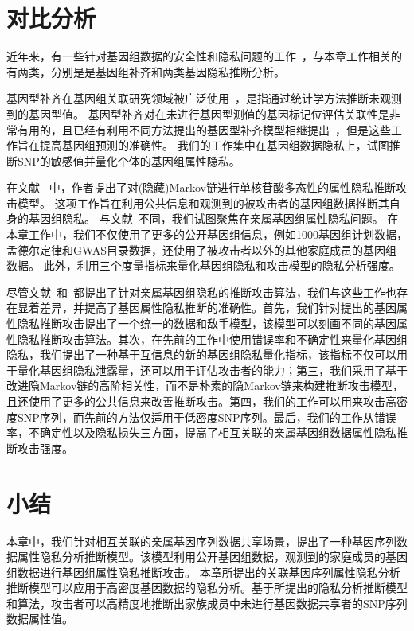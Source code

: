 \section{对比分析}

近年来，有一些针对基因组数据的安全性和隐私问题的工作~\cite{hubaux2017genomic}，与本章工作相关的有两类，分别是是基因组补齐和两类基因隐私推断分析。

基因型补齐在基因组关联研究领域被广泛使用~\cite{marchini2007newa}，是指通过统计学方法推断未观测到的基因型值。 基因型补齐对在未进行基因型测值的基因标记位评估关联性是非常有用的，且已经有利用不同方法提出的基因型补齐模型相继提出~\cite{howie2009flexible,marchini2007newa,howie2014impute2}，但是这些工作旨在提高基因组预测的准确性。 我们的工作集中在基因组数据隐私上，试图推断SNP的敏感值并量化个体的基因组属性隐私。


在文献~\cite{samani2015quantifying} 中，作者提出了对(隐藏)Markov链进行单核苷酸多态性的属性隐私推断攻击模型。 这项工作旨在利用公共信息和观测到的被攻击者的基因组数据推断其自身的基因组隐私。 与文献~\cite{samani2015quantifying}不同，我们试图聚焦在亲属基因组属性隐私问题。 在本章工作中，我们不仅使用了更多的公开基因组信息，例如1000基因组计划数据，孟德尔定律和GWAS目录数据，还使用了被攻击者以外的其他家庭成员的基因组数据。 此外，利用三个度量指标来量化基因组隐私和攻击模型的隐私分析强度。

尽管文献~\cite{humbert2013addressing,humbert2017quantifying}和~\cite{deznabi2018inference}都提出了针对亲属基因组隐私的推断攻击算法，我们与这些工作也存在显着差异，并提高了基因属性隐私推断的准确性。首先，我们针对提出的基因属性隐私推断攻击提出了一个统一的数据和敌手模型，该模型可以刻画不同的基因属性隐私推断攻击算法。其次，在先前的工作中使用错误率和不确定性来量化基因组隐私，我们提出了一种基于互信息的新的基因组隐私量化指标，该指标不仅可以用于量化基因组隐私泄露量，还可以用于评估攻击者的能力；第三，我们采用了基于改进隐Markov链的高阶相关性，而不是朴素的隐Markov链来构建推断攻击模型，且还使用了更多的公共信息来改善推断攻击。第四，我们的工作可以用来攻击高密度SNP序列，而先前的方法仅适用于低密度SNP序列。最后，我们的工作从错误率，不确定性以及隐私损失三方面，提高了相互关联的亲属基因组数据属性隐私推断攻击强度。

\section{小结}

本章中，我们针对相互关联的亲属基因序列数据共享场景，提出了一种基因序列数据属性隐私分析推断模型。该模型利用公开基因组数据，观测到的家庭成员的基因组数据进行基因组属性隐私推断攻击。 本章所提出的关联基因序列属性隐私分析推断模型可以应用于高密度基因数据的隐私分析。基于所提出的隐私分析推断模型和算法，攻击者可以高精度地推断出家族成员中未进行基因数据共享者的SNP序列数据属性值。




	


	

